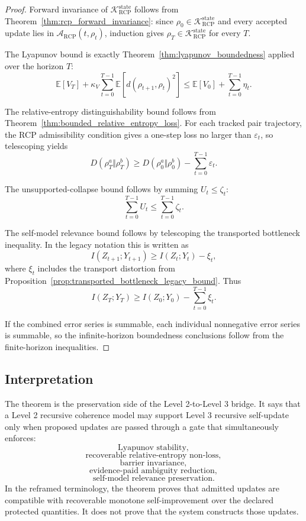 \documentclass[11pt]{article}
\newcommand{\K}{\mathcal{K}}
\newcommand{\Acal}{\mathcal{A}}
\newcommand{\1}{\mathbf{1}}
\newcommand{\eps}{\varepsilon}
\newcommand{\RCP}{\mathrm{RCP}}
\newcommand{\state}{\mathrm{state}}
\begin{document}
\begin{proof}
Forward invariance of \(\K_{\RCP}^{\state}\) follows from Theorem~\ref{thm:rcp_forward_invariance}: since \(\rho_0\in\K_{\RCP}^{\state}\) and every accepted update lies in \(\Acal_{\RCP}(t,\rho_t)\), induction gives \(\rho_T\in\K_{\RCP}^{\state}\) for every \(T\).

The Lyapunov bound is exactly Theorem~\ref{thm:lyapunov_boundedness} applied over the horizon \(T\):
\[
\mathbb E[V_T]
+
\kappa_V\sum_{t=0}^{T-1}\mathbb E[d(\rho_{t+1},\rho_t)^2]
\le
\mathbb E[V_0]+
\sum_{t=0}^{T-1}\eta_t.
\]

The relative-entropy distinguishability bound follows from Theorem~\ref{thm:bounded_relative_entropy_loss}. For each tracked pair trajectory, the RCP admissibility condition gives a one-step loss no larger than \(\eps_t\), so telescoping yields
\[
D(\rho_T^a\Vert\rho_T^b)
\ge
D(\rho_0^a\Vert\rho_0^b)-\sum_{t=0}^{T-1}\eps_t.
\]

The unsupported-collapse bound follows by summing \(U_t\le\zeta_t\):
\[
\sum_{t=0}^{T-1}U_t\le\sum_{t=0}^{T-1}\zeta_t.
\]

The self-model relevance bound follows by telescoping the transported bottleneck inequality. In the legacy notation this is written as
\[
I(Z_{t+1};Y_{t+1})
\ge
I(Z_t;Y_t)-\xi_t,
\]
where \(\xi_t\) includes the transport distortion from Proposition~\ref{prop:transported_bottleneck_legacy_bound}.
Thus
\[
I(Z_T;Y_T)
\ge
I(Z_0;Y_0)-\sum_{t=0}^{T-1}\xi_t.
\]

If the combined error series is summable, each individual nonnegative error series is summable, so the infinite-horizon boundedness conclusions follow from the finite-horizon inequalities.
\end{proof}

\subsection{Interpretation}

The theorem is the preservation side of the Level 2-to-Level 3 bridge. It says that a Level 2 recursive coherence model may support Level 3 recursive self-update only when proposed updates are passed through a gate that simultaneously enforces:
\[
\text{Lyapunov stability},
\]
\[
\text{recoverable relative-entropy non-loss},
\]
\[
\text{barrier invariance},
\]
\[
\text{evidence-paid ambiguity reduction},
\]
\[
\text{self-model relevance preservation}.
\]
In the reframed terminology, the theorem proves that admitted updates are compatible with recoverable monotone self-improvement over the declared protected quantities.  It does not prove that the system constructs those updates.
\end{document}
